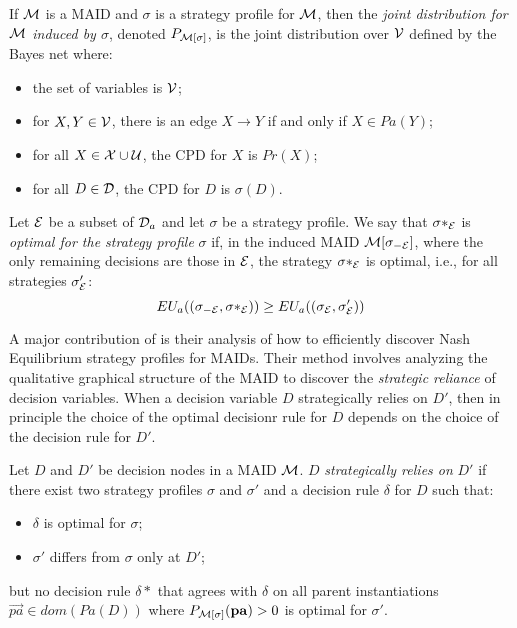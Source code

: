 \documentclass[../thesis.tex]{subfiles}
\begin{document}
\begin{dfn}
  If $\mathcal{M}$ is a MAID and $\sigma$ is a strategy profile for
  $\mathcal{M}$, then the \emph{joint distribution for $\mathcal{M}$
    induced by $\sigma$}, denoted $P_{\mathcal{M}[\sigma]}$, is the
  joint distribution over $\mathcal{V}$ defined by the Bayes
  net where:
  \begin{itemize}
  \item the set of variables is $\mathcal{V}$;
  \item for $X, Y \in \mathcal{V}$, there is an edge $X \rightarrow Y$
    if and only if $X \in Pa(Y)$;
  \item for all $X \in \mathcal{X} \cup \mathcal{U}$, the CPD for $X$ is $Pr(X)$;
  \item for all $D \in \mathcal{D}$, the CPD for $D$ is $\sigma(D)$.
  \end{itemize}
\end{dfn}

\begin{dfn}
  Let $\mathcal{E}$ be a subset of $\mathcal{D}_a$ and let $\sigma$ be a strategy
  profile.
  We say that $\sigma*_\mathcal{E}$ is \emph{optimal for the strategy profile}
  $\sigma$ if, in the induced MAID $\mathcal{M}[\sigma_{-\mathcal{E}}]$,
  where the only remaining decisions are those in $\mathcal{E}$,
  the strategy $\sigma*_{\mathcal{E}}$ is optimal, i.e., for all
  strategies $\sigma'_{\mathcal{E}}$:
  $$EU_a((\sigma_{-\mathcal{E}},\sigma*_{\mathcal{E}})) \geq EU_a((\sigma_{\mathcal{E}}, \sigma'_{\mathcal{E}}))$$
\end{dfn}

A major contribution of \cite{koller2003multi} is their analysis
of how to efficiently discover Nash Equilibrium strategy profiles
for MAIDs.
Their method involves analyzing the qualitative graphical
structure of the MAID to discover the \emph{strategic reliance}
of decision variables.
When a decision variable $D$ strategically relies on $D'$,
then in principle the choice of the optimal decisionr rule for
$D$ depends on the choice of the decision rule for $D'$.

\begin{dfn}
  \label{dfn:strategic-reliance}
  Let $D$ and $D'$ be decision nodes in a MAID $\mathcal{M}$.
  $D$ \emph{strategically relies on} $D'$ if there exist
  two strategy profiles $\sigma$ and $\sigma'$ and a
  decision rule $\delta$ for $D$ such that:
  \begin{itemize}
  \item $\delta$ is optimal for $\sigma$;
  \item $\sigma'$ differs from $\sigma$ only at $D'$;
  \end{itemize}
  but no decision rule $\delta*$ that agrees with $\delta$ on
  all parent instantiations $\vec{pa} \in dom(Pa(D))$
  where $P_{\mathcal{M}[\sigma]}(\mathbf{pa}) > 0$ is optimal for $\sigma'$.
\end{dfn}
\end{document}
